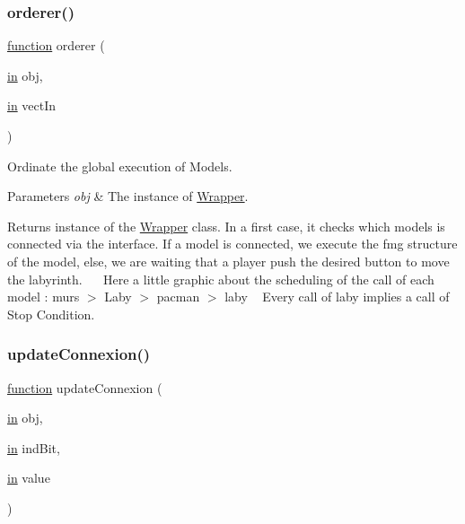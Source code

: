 \subsubsection{\texorpdfstring{orderer()}{orderer()}}
{\footnotesize\ttfamily \hyperlink{_plan__desuma_functions_8m_ac2ffb26d6f42d3bbcd7847b0873403f4}{function} orderer (\begin{DoxyParamCaption}\item[{\hyperlink{class_wrapper_a5e252d97ca5bf85c5753e2914673eead}{in}}]{obj,  }\item[{\hyperlink{class_wrapper_a5e252d97ca5bf85c5753e2914673eead}{in}}]{vect\+In }\end{DoxyParamCaption})}



Ordinate the global execution of Models. 


\begin{DoxyParams}{Parameters}
{\em obj} & The instance of \hyperlink{class_wrapper}{Wrapper}. \\
\hline
\end{DoxyParams}
\begin{DoxyReturn}{Returns}
instance of the \hyperlink{class_wrapper}{Wrapper} class. In a first case, it checks which models is connected via the interface. If a model is connected, we execute the \textquotesingle{}fmg\textquotesingle{} structure of the model, else, we are waiting that a player push the desired button to move the labyrinth.~\newline
~\newline
 Here a little graphic about the scheduling of the call of each model \+: murs $>$ Laby $>$ pacman $>$ laby ~\newline
 Every call of \textquotesingle{}laby\textquotesingle{} implies a call of Stop Condition. 
\end{DoxyReturn}
\mbox{\label{class_wrapper_aa41b9b215897635f48e1c8a4eaca7640}} 
\subsubsection{\texorpdfstring{update\+Connexion()}{updateConnexion()}}
{\footnotesize\ttfamily \hyperlink{_plan__desuma_functions_8m_ac2ffb26d6f42d3bbcd7847b0873403f4}{function} update\+Connexion (\begin{DoxyParamCaption}\item[{\hyperlink{class_wrapper_a5e252d97ca5bf85c5753e2914673eead}{in}}]{obj,  }\item[{\hyperlink{class_wrapper_a5e252d97ca5bf85c5753e2914673eead}{in}}]{ind\+Bit,  }\item[{\hyperlink{class_wrapper_a5e252d97ca5bf85c5753e2914673eead}{in}}]{value }\end{DoxyParamCaption})}



